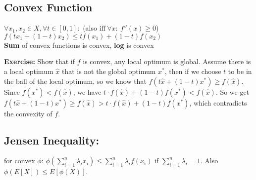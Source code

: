 \subsection*{Convex Function}
$\forall x_1, x_2 \in X, \forall t \in [0,1]: $ \quad (also $\text{iff} \ \forall x: \  f''(x) \geq 0$)\\
$f(tx_1 + (1-t)x_2)\leq t f(x_1) + (1-t)f(x_2)$ \\
\textbf{Sum} of convex functions is convex, \textbf{log} is convex

\textbf{Exercise:} Show that if $f$ is convex, any local optimum is global. Assume there is a local optimum $\hat x$ that is not the global optimum $x^*$, then if we choose $t$ to be in the ball of the local optimum, so we know that $f(t\hat x + (1-t)x^*) \geq f(\hat x)$. Since $f(x^*) < f(\hat x)$,  we have $t\cdot f(\hat x) + (1-t) f(x^*) < f(\hat x)$. So we get $f(t\hat x + (1-t)x^*) \geq f(\hat x) > t\cdot f(\hat x) + (1-t)f(x^*)$, which contradicts the convexity of $f$.


\subsection*{Jensen Inequality:} 
for convex $\phi$: $\phi (\sum_{i=1}^n \lambda_i x_i) \leq \sum_{i=1}^n \lambda_i f(x_i)$ if $\sum_{i=1}^n \lambda_i = 1$. Also $\phi(E[X])\leq E[\phi(X)]$.